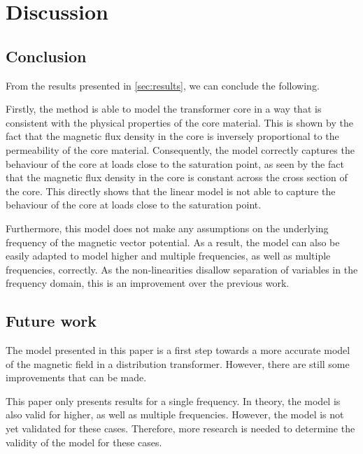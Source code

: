 \chapter{Discussion} \label{sec:discussion}


\section{Conclusion}
From the results presented in \autoref{sec:results}, we can conclude the following.

Firstly, the method is able to model the transformer core in a way that is consistent with the physical properties of the core material. This is shown by the fact that the magnetic flux density in the core is inversely proportional to the permeability of the core material. Consequently, the model correctly captures the behaviour of the core at loads close to the saturation point, as seen by the fact that the magnetic flux density in the core is constant across the cross section of the core. This directly shows that the linear model is not able to capture the behaviour of the core at loads close to the saturation point.

Furthermore, this model does not make any assumptions on the underlying frequency of the magnetic vector potential. As a result, the model can also be easily adapted to model higher and multiple frequencies, as well as multiple frequencies, correctly. As the non-linearities disallow separation of variables in the frequency domain, this is an improvement over the previous work. 

\section{Future work}
The model presented in this paper is a first step towards a more accurate model of the magnetic field in a distribution transformer. However, there are still some improvements that can be made.
\vspace{5pt}

\noindent This paper only presents results for a single frequency. In theory, the model is also valid for higher, as well as multiple frequencies. However, the model is not yet validated for these cases. Therefore, more research is needed to determine the validity of the model for these cases.

